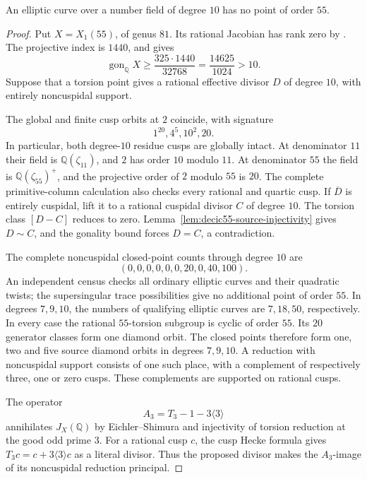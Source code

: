 \begin{proposition}\label{prop:decic-no55}
An elliptic curve over a number field of degree $10$ has no point
of order $55$.
\end{proposition}
\begin{proof}
Put $X=X_1(55)$, of genus $81$.
Its rational Jacobian has rank zero by
\cite[Theorem~3.1]{DEHMZ}.
The projective index is $1440$, and \cite[(2.1)]{NV} gives
\[
 \operatorname{gon}_{\mathbb Q}X\geq
 \frac{325\cdot1440}{32768}=\frac{14625}{1024}>10.
\]
Suppose that a torsion point gives a rational effective divisor
$D$ of degree $10$, with entirely noncuspidal support.

The global and finite cusp orbits at $2$ coincide, with signature
\[
 1^{20},4^5,10^2,20.
\]
In particular, both degree-$10$ residue cusps are globally intact.
At denominator $11$ their field is $\mathbb Q(\zeta_{11})$,
and $2$ has order $10$ modulo $11$.
At denominator $55$ the field is
$\mathbb Q(\zeta_{55})^+$, and the projective order of $2$
modulo $55$ is $20$.
The complete primitive-column calculation also checks every
rational and quartic cusp.
If $\overline D$ is entirely cuspidal, lift it to a rational
cuspidal divisor $C$ of degree $10$.
The torsion class $[D-C]$ reduces to zero.
Lemma~\ref{lem:decic55-source-injectivity} gives $D\sim C$,
and the gonality bound forces $D=C$, a contradiction.

The complete noncuspidal closed-point counts through degree $10$
are
\[
 (0,0,0,0,0,0,20,0,40,100).
\]
An independent census checks all ordinary elliptic curves and
their quadratic twists; the supersingular trace possibilities
give no additional point of order $55$.
In degrees $7,9,10$, the numbers of qualifying elliptic curves
are $7,18,50$, respectively.
In every case the rational $55$-torsion subgroup is cyclic of
order $55$. Its $20$ generator classes form one diamond orbit.
The closed points therefore form one, two and five source
diamond orbits in degrees $7,9,10$.
A reduction with noncuspidal support consists of one such place,
with a complement of respectively three, one or zero cusps.
These complements are supported on rational cusps.

The operator
\[
 A_3=T_3-1-3\langle3\rangle
\]
annihilates $J_X(\mathbb Q)$ by Eichler--Shimura and injectivity
of torsion reduction at the good odd prime $3$.
For a rational cusp $c$, the cusp Hecke formula gives
$T_3c=c+3\langle3\rangle c$ as a literal divisor.
Thus the proposed divisor makes the $A_3$-image of its
noncuspidal reduction principal.


\end{proof}
